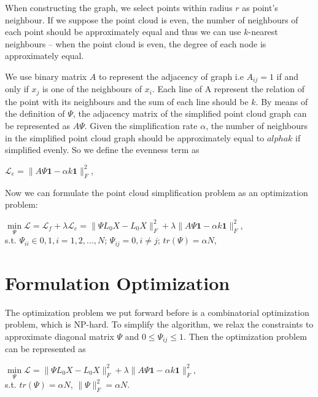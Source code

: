 \documentclass[10pt,conference,a4paper]{IEEEtran}
\begin{document}
When constructing the graph, we select points within radius $r$ as 
point's neighbour. If we suppose the point cloud is even, the number 
of neighbours of each point should be approximately equal and thus 
we can use $k$-nearest neighbours -- when the point cloud is even, the 
degree of each node is approximately equal.

We use binary matrix $A$ to represent the adjacency of graph i.e 
$A_{ij}=1$ if and only if $x_j$ is one of the neighbours of $x_i$.
Each line of A represent the relation of the point with its neighbours 
and the sum of each line should be $k$. By means of the definition of 
$\Psi$, the adjacency matrix of the simplified point cloud graph can 
be represented as $A\Psi$. Given the simplification rate $\alpha$, the 
number of neighbours in the simplified point cloud graph should be 
approximately equal to $alpha k$ if simplified evenly. So we define the 
evenness term as
\begin{center}
$\mathcal{L}_e=\lVert A\Psi\boldsymbol{1}-
\alpha k\boldsymbol{1}\rVert^2_F$,
\end{center}

Now we can formulate the point cloud simplification problem as an 
optimization problem:
\begin{center}
$\min\limits_{\Psi}\mathcal{L}=\mathcal{L}_f+\lambda\mathcal{L}_e=
\lVert\Psi L_0X-L_0X\rVert^2_F+\lambda\lVert A\Psi\boldsymbol{1}-
\alpha k\boldsymbol{1}\rVert^2_F$,\\
s.t. $\Psi_{ii}\in{0,1}, i=1,2,...,N$; $\Psi_{ij}=0, i\neq j$; 
$tr(\Psi)=\alpha N$,
\end{center}



\section{Formulation Optimization}

The optimization problem we put forward before is a combinatorial 
optimization problem, which is NP-hard. To simplify the algorithm, 
we relax the constraints to approximate diagonal matrix $\Psi$ and 
$0 \le \Psi_{ij} \le 1$. Then the optimization problem can be 
represented as
\begin{center}
$\min\limits_{\Psi}\mathcal{L}=\lVert\Psi L_0X-L_0X\rVert^2_F+\lambda
\lVert A\Psi\boldsymbol{1}-\alpha k\boldsymbol{1}\rVert^2_F$,\\
s.t. $tr(\Psi)=\alpha N$, $\lVert\Psi\rVert^2_F=\alpha N$.
\end{center}
\end{document}
